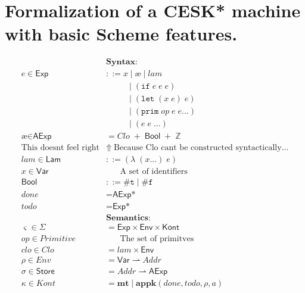 \documentclass[12pt,draft]{article}
\newcommand\mae{\ensuremath{\text{\ae}}}
\begin{document}
\newcommand{\lamsyn}[2]{(\lambda\;(#1 ...)\;#2)}
\newcommand{\letsyn}[3]{(\texttt{let}\;(#1\;#2)\;#3)}
\newcommand{\ifsyn}[3]{(\texttt{if}\;#1\;#2\;#3)}
\newcommand{\primsyn}[3]{(\texttt{prim}\;#1\;#2\;#3 ...)}
\newcommand{\truesyn}{\texttt{\#t}}
\newcommand{\falsesyn}{\texttt{\#f}}



\section{Formalization of a CESK* machine with basic Scheme features.}


\begin{align*}
&\textbf{Syntax:} \\
e \in \textsf{Exp} &::= x  \;|\; \mae \;|\; lam \\
				  &	\;\;\;\;\;\;\;\;\; \;|\; \ifsyn{e}{e}{e}  \\
				  &	\;\;\;\;\;\;\;\;\; \;|\; \letsyn{x}{e}{e} \\
				  &	\;\;\;\;\;\;\;\;\; \;|\; \primsyn{op}{e}{e} \\
				  &	\;\;\;\;\;\;\;\;\; \;|\; (e \; e \; ...) \\
\mae \in \textsf{AExp} &= \mathit{Clo} \;+\; \textsf{Bool} \;+\; \mathbb{Z} \\
 \text{This doesnt feel right} &\Uparrow\; \text{Because Clo cant be constructed syntactically...} \\
lam \in \textsf{Lam} &::= \lamsyn{x}{e} \\
x \in \textsf{Var} &\;\;\;\;\;\; \text{A set of identifiers} \\
\textsf{Bool} &::= \truesyn \;|\; \falsesyn \\
done &= \textsf{AExp*} \\
todo &= \textsf{Exp*} \\
&\textbf{Semantics:} \\
\varsigma \in \Sigma &= \textsf{Exp} \times \textsf{Env} \times \textsf{Kont} \\
op \in \textit{Primitive} &\;\;\;\;\;\; \text{The set of primitves} \\
\mathit{clo} \in \mathit{Clo} &= lam \times \textsf{Env} \\
\rho \in \textit{Env} &= \textsf{Var} \rightharpoonup \textit{Addr} \\
\sigma \in \textsf{Store} &= \textit{Addr} \rightharpoonup \textsf{AExp} \\
\kappa \in \textit{Kont} &= \textbf{mt} \;|\; \textbf{appk}(done, todo, \rho, a) \\

\end{align*}
\end{document}
